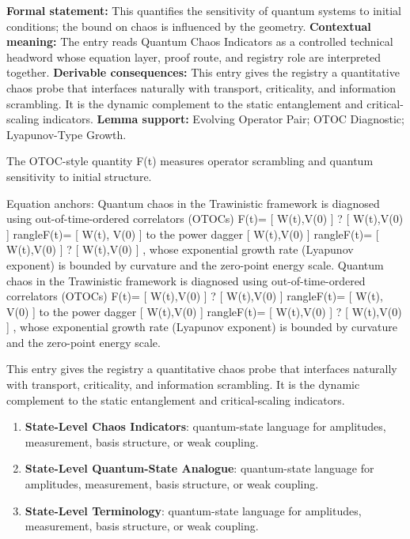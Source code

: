 \begingroup\footnotesize\setlength{\emergencystretch}{3em}\sloppy
\textbf{Formal statement:} This quantifies the sensitivity of quantum systems to initial conditions; the bound on chaos is influenced by the geometry. \textbf{Contextual meaning:} The entry reads Quantum Chaos Indicators as a controlled technical headword whose equation layer, proof route, and registry role are interpreted together. \textbf{Derivable consequences:} This entry gives the registry a quantitative chaos probe that interfaces naturally with transport, criticality, and information scrambling. It is the dynamic complement to the static entanglement and critical-scaling indicators. \textbf{Lemma support:} Evolving Operator Pair; OTOC Diagnostic; Lyapunov-Type Growth.\par
\endgroup

The OTOC-style quantity F(t) measures operator scrambling and quantum sensitivity to initial structure.

Equation anchors: Quantum chaos in the Trawinistic framework is diagnosed using out-of-time-ordered correlators (OTOCs) F(t)= [ W(t),V(0) ] ? [ W(t),V(0) ] rangleF(t)= [ W(t), V(0) ] to the power dagger [ W(t),V(0) ] rangleF(t)= [ W(t),V(0) ] ? [ W(t),V(0) ] , whose exponential growth rate (Lyapunov exponent) is bounded by curvature and the zero-point energy scale. Quantum chaos in the Trawinistic framework is diagnosed using out-of-time-ordered correlators (OTOCs) F(t)= [ W(t),V(0) ] ? [ W(t),V(0) ] rangleF(t)= [ W(t), V(0) ] to the power dagger [ W(t),V(0) ] rangleF(t)= [ W(t),V(0) ] ? [ W(t),V(0) ] , whose exponential growth rate (Lyapunov exponent) is bounded by curvature and the zero-point energy scale.

This entry gives the registry a quantitative chaos probe that interfaces naturally with transport, criticality, and information scrambling. It is the dynamic complement to the static entanglement and critical-scaling indicators.
\endgroup

\begingroup\footnotesize\sloppy
\begin{enumerate}[leftmargin=1.35em,itemsep=1pt,topsep=1pt,parsep=0pt]
\item \textbf{State-Level Chaos Indicators}: quantum-state language for amplitudes, measurement, basis structure, or weak coupling.
\item \textbf{State-Level Quantum-State Analogue}: quantum-state language for amplitudes, measurement, basis structure, or weak coupling.
\item \textbf{State-Level Terminology}: quantum-state language for amplitudes, measurement, basis structure, or weak coupling.
\end{enumerate}
\endgroup

